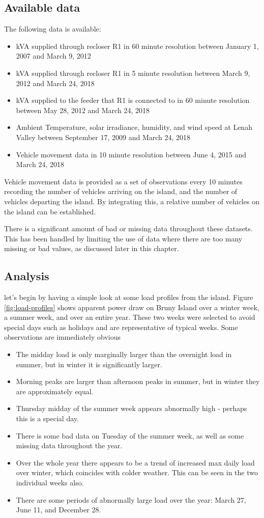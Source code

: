 \subsection{Available data}
The following data is available:
\begin{itemize}
	\item kVA supplied through recloser R1 in 60 minute resolution between January 1, 2007 and March 9, 2012
	\item kVA supplied through recloser R1 in 5 minute resolution between March 9, 2012 and March 24, 2018
	\item kVA supplied to the feeder that R1 is connected to in 60 minute resolution between May 28, 2012 and March 24, 2018
	\item Ambient Temperature, solar irradiance, humidity, and wind speed at Lenah Valley between September 17, 2009 and March 24, 2018
	\item Vehicle movement data in 10 minute resolution between June 4, 2015 and March 24, 2018
\end{itemize}	
Vehicle movement data is provided as a set of observations every 10 minutes recording the number of vehicles arriving on the island, and the number of vehicles departing the island.
By integrating this, a relative number of vehicles on the island can be established.

There is a significant amount of bad or missing data throughout these datasets.
This has been handled by limiting the use of data where there are too many missing or bad values, as discussed later in this chapter.	


\subsection{Analysis}
let's begin by having a simple look at some load profiles from the island.
Figure \ref{fig:load-profiles} shows apparent power draw on Bruny Island over a winter week, a summer week, and over an entire year.
These two weeks were selected to avoid special days such as holidays and are representative of typical weeks.
Some observations are immediately obvious
\begin{itemize}
	\item The midday load is only marginally larger than the overnight load in summer, but in winter it is significantly larger.
	\item Morning peaks are larger than afternoon peaks in summer, but in winter they are approximately equal.
	\item Thursday midday of the summer week appears abnormally high - perhaps this is a special day.
	\item There is some bad data on Tuesday of the summer week, as well as some missing data throughout the year.
	\item Over the whole year there appears to be a trend of increased max daily load over winter, which coincides with colder weather. This can be seen in the two individual weeks also.
	\item There are some periods of abnormally large load over the year: March 27, June 11, and December 28.
\end{itemize}

